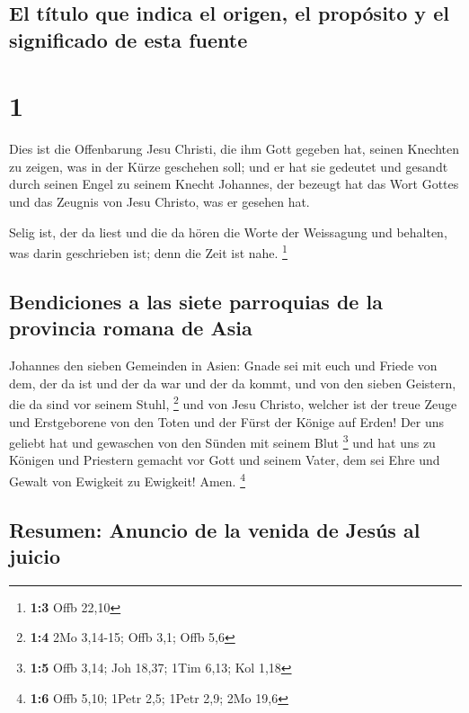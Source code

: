 \hypertarget{el-tuxedtulo-que-indica-el-origen-el-propuxf3sito-y-el-significado-de-esta-fuente}{%
\subsection{El título que indica el origen, el propósito y el
significado de esta
fuente}\label{el-tuxedtulo-que-indica-el-origen-el-propuxf3sito-y-el-significado-de-esta-fuente}}

\hypertarget{section}{%
\section{1}\label{section}}

 Dies ist die Offenbarung Jesu Christi, die ihm Gott
gegeben hat, seinen Knechten zu zeigen, was in der Kürze geschehen soll;
und er hat sie gedeutet und gesandt durch seinen Engel zu seinem Knecht
Johannes,  der bezeugt hat das Wort Gottes und das Zeugnis
von Jesu Christo, was er gesehen hat.

 Selig ist, der da liest und die da hören die Worte der
Weissagung und behalten, was darin geschrieben ist; denn die Zeit ist
nahe. \footnote{\textbf{1:3} Offb 22,10}

\hypertarget{bendiciones-a-las-siete-parroquias-de-la-provincia-romana-de-asia}{%
\subsection{Bendiciones a las siete parroquias de la provincia romana de
Asia}\label{bendiciones-a-las-siete-parroquias-de-la-provincia-romana-de-asia}}

 Johannes den sieben Gemeinden in Asien: Gnade sei mit
euch und Friede von dem, der da ist und der da war und der da kommt, und
von den sieben Geistern, die da sind vor seinem Stuhl, \footnote{\textbf{1:4}
  2Mo 3,14-15; Offb 3,1; Offb 5,6}  und von Jesu Christo,
welcher ist der treue Zeuge und Erstgeborene von den Toten und der Fürst
der Könige auf Erden! Der uns geliebt hat und gewaschen von den Sünden
mit seinem Blut \footnote{\textbf{1:5} Offb 3,14; Joh 18,37; 1Tim 6,13;
  Kol 1,18}  und hat uns zu Königen und Priestern gemacht
vor Gott und seinem Vater, dem sei Ehre und Gewalt von Ewigkeit zu
Ewigkeit! Amen. \footnote{\textbf{1:6} Offb 5,10; 1Petr 2,5; 1Petr 2,9;
  2Mo 19,6}

\hypertarget{resumen-anuncio-de-la-venida-de-jesuxfas-al-juicio}{%
\subsection{Resumen: Anuncio de la venida de Jesús al
juicio}\label{resumen-anuncio-de-la-venida-de-jesuxfas-al-juicio}}

